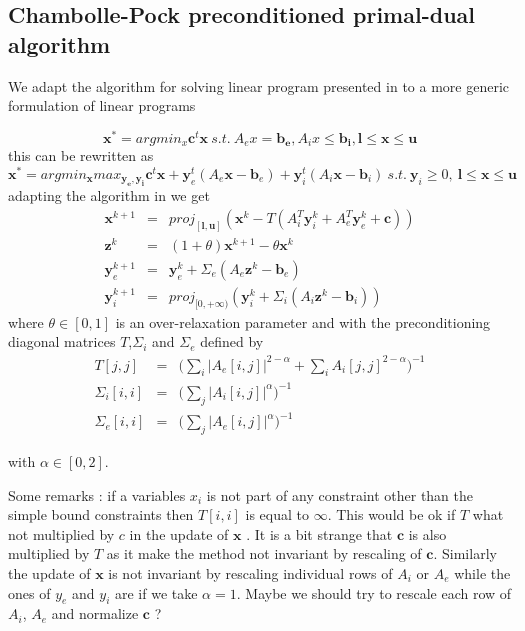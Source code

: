 \documentclass[11pt]{article}
\begin{document}
\subsection{Chambolle-Pock preconditioned primal-dual algorithm}
We adapt the algorithm for solving linear program presented in \cite{Chambolle2011} to a more generic formulation of linear programs


\begin{equation}
\mathbf{x}^*=argmin_x \mathbf{c}^t\mathbf{x} ~  s.t.~  A_ex=\mathbf{b_e},A_ix\leq\mathbf{ b_i}, \mathbf{l}\leq \mathbf{x}\leq \mathbf{u} 
\end{equation}
this can be rewritten as 
\begin{equation}
\mathbf{x}^*=argmin_\mathbf{x} max_{\mathbf{y_e},\mathbf{y_i}}\mathbf{c}^t\mathbf{x}+\mathbf{y}_e^t(A_e\mathbf{x}-\mathbf{b}_e)+ \mathbf{y}_i^t(A_i\mathbf{x}-\mathbf{b}_i)~  s.t.~ \mathbf{y}_i\geq 0,~ \mathbf{l}\leq \mathbf{x}\leq \mathbf{u} 
\end{equation}
adapting the algorithm in \cite{Chambolle2011}  we get
\begin{eqnarray}
\mathbf{x}^{k+1}&=&proj_{[\mathbf{l},\mathbf{u}]} (\mathbf{x}^k-T(A_i^T\mathbf{y}_i^k+A_e^T\mathbf{y}_e^k+\mathbf{c}))\\
\mathbf{z}^k&=&(1+\theta)\mathbf{x}^{k+1}-\theta \mathbf{x}^k\\
\mathbf{y}_e^{k+1}&=&\mathbf{y}_e^k+\Sigma_e(A_e \mathbf{z}^k-\mathbf{b}_e)\\
\mathbf{y}_i^{k+1}&=&proj_{[0,+\infty)}(\mathbf{y}_i^k+\Sigma_i(A_i \mathbf{z}^k-\mathbf{b}_i))
\end{eqnarray}
where $\theta\in[0,1]$ is an over-relaxation parameter and with the preconditioning diagonal matrices $T$,$\Sigma_i$ and $\Sigma_e$ defined by
\begin{eqnarray}
T[j,j]&=&\big(\sum_i |A_e[i,j]|^{2-\alpha}+\sum_i A_i[j,j]^{2-\alpha}\big)^{-1}\\
\Sigma_i[i,i]&=&\big(\sum_j |A_i[i,j]|^{\alpha}\big)^{-1}\\
\Sigma_e[i,i]&=&\big(\sum_j |A_e[i,j]|^{\alpha}\big)^{-1}
\end{eqnarray}

with $\alpha\in[0,2]$.


Some remarks : if a variables $x_i$ is  not part of any constraint other than the simple bound constraints then  $T[i,i]$ is equal to $\infty$. This would be ok if $T$ what not multiplied by $c$ in the update of $\mathbf{x}$ .
It is a bit strange that $\mathbf{c}$ is also multiplied by $T$ as it make the method not invariant by rescaling of $\mathbf{c}$. Similarly the update of $\mathbf{x}$ is not invariant by rescaling individual rows of $A_i$ or $A_e$
while the ones of $y_e$ and $y_i$ are if we take $\alpha=1$.
Maybe we should try to rescale each row of $A_i$, $A_e$ and normalize $\mathbf{c}$ ?
\end{document}
